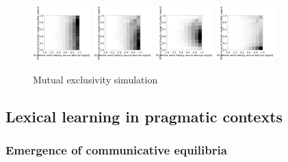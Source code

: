 \documentclass{article} %
\begin{document}
\begin{figure}
  \centering
  \includegraphics[width=0.20\textwidth]{figures/ME-1dax.pdf}
  \includegraphics[width=0.20\textwidth]{figures/ME-flat-10dog-10dax.pdf}
  \includegraphics[width=0.20\textwidth]{figures/ME-antisparse-10dog-10dax.pdf}
  \includegraphics[width=0.20\textwidth]{figures/ME-sparse-10dog-10dax.pdf}
  \caption{Mutual exclusivity simulation}
  \label{fig:mutual-exclusivity}
\end{figure}

\subsection{Lexical learning in pragmatic contexts}

\subsubsection{Emergence of communicative equilibria}
\end{document}

